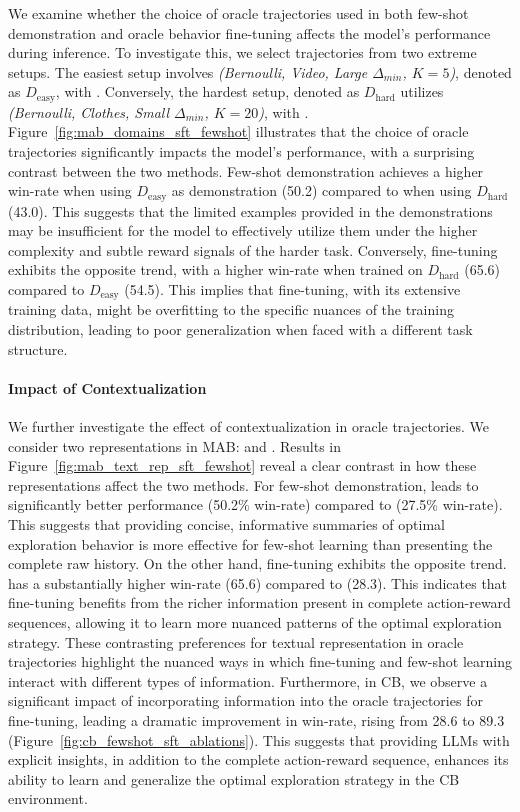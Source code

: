 We examine whether the choice of oracle trajectories used in both few-shot demonstration and oracle behavior fine-tuning affects the model's performance during inference. To investigate this, we select trajectories from two extreme setups. The easiest setup involves \emph{(Bernoulli, Video, Large $\Delta_{min}$, $K=5$)}, denoted as $D_{\text{easy}}$, with \AG. Conversely, the hardest setup, denoted as $D_{\text{hard}}$ utilizes \emph{(Bernoulli, Clothes, Small $\Delta_{min}$, $K=20$)}, with \RH.  
Figure~\ref{fig:mab_domains_sft_fewshot} illustrates that the choice of oracle trajectories significantly impacts the model's performance, with a surprising contrast between the two \ad methods.
Few-shot demonstration achieves a higher win-rate when using $D_{\text{easy}}$ as demonstration (50.2) compared to when using $D_{\text{hard}}$ (43.0). This suggests that the limited examples provided in the demonstrations may be insufficient for the model to effectively utilize them under the higher complexity and subtle reward signals of the harder task. 
Conversely, fine-tuning exhibits the opposite trend, with a higher win-rate when trained on $D_{\text{hard}}$ (65.6) compared to $D_{\text{easy}}$ (54.5). 
This implies that fine-tuning, with its extensive training data, might be overfitting to the specific nuances of the training distribution, leading to poor generalization when faced with a different task structure.

\paragraph{Impact of Contextualization}
We further investigate the effect of contextualization in oracle trajectories. We consider two representations in MAB: \RH and \SH.
Results in Figure~\ref{fig:mab_text_rep_sft_fewshot} reveal a  clear contrast in how these representations affect the two \ad methods. For few-shot demonstration, \SH leads to significantly better performance (50.2\% win-rate) compared to \RH (27.5\% win-rate).  This suggests that providing concise, informative summaries of optimal exploration behavior is more effective for few-shot learning than presenting the complete raw history. 
On the other hand, fine-tuning exhibits the opposite trend. \RH has a substantially higher win-rate (65.6) compared to \SH (28.3). This indicates that fine-tuning benefits from the richer information present in complete action-reward sequences, allowing it to learn more nuanced patterns of the optimal exploration strategy.
These contrasting preferences for textual representation in oracle trajectories highlight the nuanced ways in which fine-tuning and few-shot learning interact with different types of information. 
Furthermore, in CB, we observe a significant impact of incorporating \AG information into the oracle trajectories for fine-tuning, leading a dramatic improvement in win-rate, rising from 28.6 to 89.3 (Figure~\ref{fig:cb_fewshot_sft_ablations}).
This suggests that providing LLMs with explicit insights, in addition to the complete action-reward sequence, enhances its ability to learn and generalize the optimal exploration strategy in the CB environment. 

